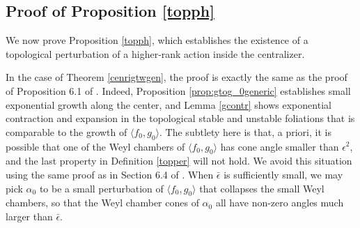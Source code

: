 \documentclass[11pt]{amsart}
\numberwithin{equation}{section}
\theoremstyle{plain}
\begin{document}
\subsection{Proof of Proposition \ref{topph}}\label{sec:pftopph}

We now prove Proposition \ref{topph}, which establishes the existence
of a topological perturbation of a higher‑rank action inside the
centralizer.

In the case of Theorem \ref{cenrigtwgen}, the proof is exactly the same as the proof of Proposition 6.1 of \cite{Wang}. Indeed, Proposition \ref{prop:gtog_0generic} establishes small exponential growth along the center, and Lemma \ref{gcontr} shows exponential contraction and expansion in the topological stable and unstable foliations that is comparable to the growth of $\langle f_0,g_0\rangle$. The subtlety here is that, a priori, it is possible that one of the Weyl chambers of $\langle f_0,g_0\rangle$ has cone angle smaller than $\epsilon^2$, and the last property in Definition \ref{topper} will not hold. We avoid this situation using the same proof as in Section 6.4 of \cite{Wang}. When $\bar\epsilon$ is sufficiently small, we may pick $\alpha_0$ to be a small perturbation of $\langle f_0,g_0\rangle$ that collapses the small Weyl chambers, so that the Weyl chamber cones of $\alpha_0$ all have non-zero angles much larger than $\bar{\epsilon}$. 
\end{document}
